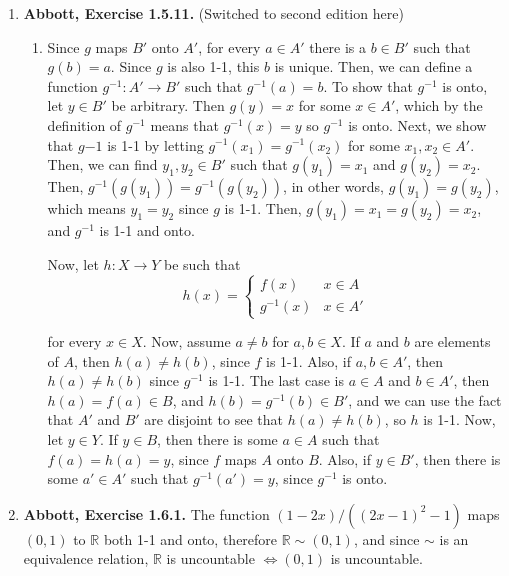 \documentclass{article}
\newcommand{\R}{\mathbb{R}}
\newcommand{\exc}[2][Abbott]{\item \textbf{#1, Exercise #2.}}
\begin{document}
\begin{enumerate}
	\exc{1.5.11} (Switched to second edition here)
				      	          
	\begin{enumerate}
		\item Since $g$ maps $B'$ onto $A'$, for every $a \in A'$ there is a $b \in B'$ such that $g(b) = a$. Since $g$ is also 1-1, this $b$ is unique. Then, we can define a function $g^{-1} : A' \rightarrow B'$ such that $g^{-1}(a) = b$. To show that $g^{-1}$ is onto, let $y \in B'$ be arbitrary. Then $g(y) = x$ for some $x \in A'$, which by the definition of $g^{-1}$ means that $g^{-1}(x) = y$ so $g^{-1}$ is onto. Next, we show that $g{-1}$ is 1-1 by letting $g^{-1}(x_1) = g^{-1}(x_2)$ for some $x_1, x_2 \in A'$. Then, we can find $y_1, y_2 \in B'$ such that $g(y_1) = x_1$ and $g(y_2) = x_2$. Then, $g^{-1}(g(y_1)) = g^{-1}(g(y_2))$, in other words, $g(y_1) = g(y_2)$, which means $y_1 = y_2$ since $g$ is 1-1. Then, $g(y_1) = x_1 = g(y_2) = x_2$, and $g^{-1}$ is 1-1 and onto.
		      		      		      	      	      	      	              
		      Now, let $h : X \rightarrow Y$ be such that 
		      \begin{equation*}
		      	h(x) = \begin{cases}
		      	f(x) & x \in A \\ 
		      	g^{-1}(x) & x \in A'
		      	\end{cases}
		      \end{equation*}
		      		      		      	      	      	      	              
		      for every $x \in X$. Now, assume $a \neq b$ for $a, b \in X$. If $a$ and $b$ are elements of $A$, then $h(a) \neq h(b)$, since $f$ is 1-1. Also, if $a,b \in A'$, then $h(a) \neq h(b)$ since $g^{-1}$ is 1-1. The last case is $a \in A$ and $b \in A'$, then $h(a)=f(a) \in B$, and $h(b)=g^{-1}(b) \in B'$, and we can use the fact that $A'$ and $B'$ are disjoint to see that $h(a) \neq h(b)$, so $h$ is 1-1. Now, let $y \in Y$. If $y \in B$, then there is some $a \in A$ such that $f(a)=h(a)=y$, since $f$ maps $A$ onto $B$. Also, if $y \in B'$, then there is some $a' \in A'$ such that $g^{-1}(a') = y$, since $g^{-1}$ is onto.
	\end{enumerate}
				      	          
	\exc{1.6.1}
	The function $(1-2x)/((2x-1)^2-1)$ maps $(0, 1)$ to $\R$ both 1-1 and onto, therefore $\R \sim (0, 1)$, and since $\sim$ is an equivalence relation, $\R$ is uncountable $\iff (0, 1)$ is uncountable. 
				      	          

\end{enumerate}
\end{document}
